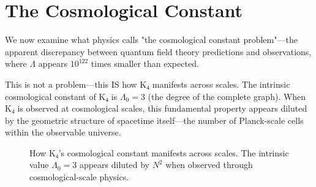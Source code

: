 \documentclass[11pt,a4paper]{book}
\begin{document}

\chapter{The Cosmological Constant}
\label{chap:cosmological-constant}

We now examine what physics calls "the cosmological constant problem"—the apparent discrepancy between quantum field theory predictions and observations, where $\Lambda$ appears $10^{122}$ times smaller than expected.

This is not a problem—this IS how K₄ manifests across scales. The intrinsic cosmological constant of K₄ is $\Lambda_0 = 3$ (the degree of the complete graph). When K₄ is observed at cosmological scales, this fundamental property appears diluted by the geometric structure of spacetime itself—the number of Planck-scale cells within the observable universe.

\begin{figure}[h]
\centering
{}
\caption{How K₄'s cosmological constant manifests across scales. The intrinsic value $\Lambda_0 = 3$ appears diluted by $N^2$ when observed through cosmological-scale physics.}
\label{fig:lambda-dilution}
\end{figure}
\end{document}
